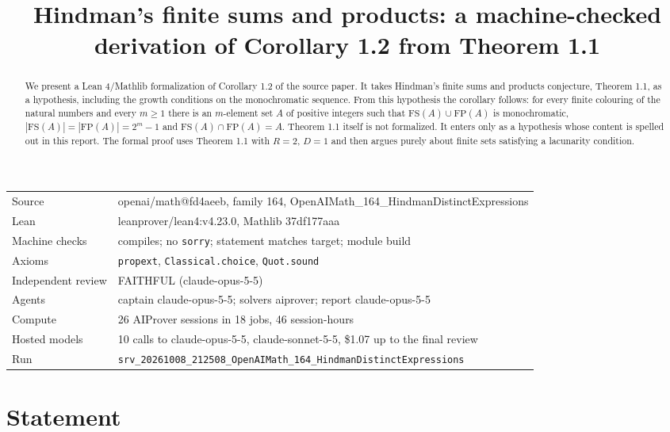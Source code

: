 \documentclass[11pt]{article}
\title{Hindman's finite sums and products: a machine-checked derivation of Corollary 1.2 from Theorem 1.1}
\date{}
\theoremstyle{definition}
\theoremstyle{remark}
\begin{document}
\maketitle
\begin{abstract}
We present a Lean 4/Mathlib formalization of Corollary 1.2 of the source paper. It takes Hindman's finite sums and products conjecture, Theorem 1.1, as a hypothesis, including the growth conditions on the monochromatic sequence. From this hypothesis the corollary follows: for every finite colouring of the natural numbers and every $m\ge 1$ there is an $m$-element set $A$ of positive integers such that $\mathrm{FS}(A)\cup\mathrm{FP}(A)$ is monochromatic, $|\mathrm{FS}(A)|=|\mathrm{FP}(A)|=2^m-1$ and $\mathrm{FS}(A)\cap\mathrm{FP}(A)=A$. Theorem 1.1 itself is not formalized. It enters only as a hypothesis whose content is spelled out in this report. The formal proof uses Theorem 1.1 with $R=2$, $D=1$ and then argues purely about finite sets satisfying a lacunarity condition.
\end{abstract}

\begin{center}\small
\begin{tabular}{@{}ll@{}}
\toprule
Source & openai/math@fd4aeeb, family 164, OpenAIMath\_164\_HindmanDistinctExpressions \\
Lean & leanprover/lean4:v4.23.0, Mathlib 37df177aaa \\
Machine checks & compiles; no \texttt{sorry}; statement matches target; module build \\
Axioms & \texttt{propext}, \texttt{Classical.choice}, \texttt{Quot.sound} \\
Independent review & FAITHFUL (claude-opus-5-5) \\
Agents & captain claude-opus-5-5; solvers aiprover; report claude-opus-5-5 \\
Compute & 26 AIProver sessions in 18 jobs, 46 session-hours \\
Hosted models & 10 calls to claude-opus-5-5, claude-sonnet-5-5, \$1.07 up to the final review \\
Run & \texttt{srv\_20261008\_212508\_OpenAIMath\_164\_HindmanDistinctExpressions} \\
\bottomrule
\end{tabular}
\end{center}

\tableofcontents

\section{Statement}
\end{document}
